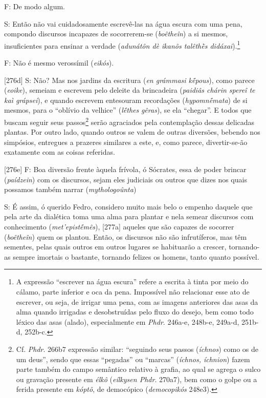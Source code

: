 F: De modo algum.

S: Então não vai cuidadosamente escrevê-las na água escura com uma pena,
compondo discursos incapazes de socorrerem-se (\emph{boêtheîn}) a si
mesmos, insuficientes para ensinar a verdade (\emph{adunátôn dè ikanôs
talêthḕs didáxai}).\footnote{A expressão ``escrever na água escura''
  refere a escrita à tinta por meio do cálamo, parte inferior e oca da
  pena. Impossível não relacionar esse ato de escrever, ou seja, de
  irrigar uma pena, com as imagens anteriores das asas da alma quando
  irrigadas e desobstruídas pelo fluxo do desejo, bem como todo léxico
  das asas (alado), especialmente em \emph{Phdr}. 246a-e, 248b-e,
  249a-d, 251b-d, 252b-c.}

F: Não é mesmo verossímil (\emph{eikós}).

{[}276d{]} S: Não? Mas nos jardins da escritura (\emph{en grámmasi
kḗpous}), como parece (\emph{eoike}), semeiam e escrevem pelo deleite da
brincadeira (\emph{paidiâs chárin spereî te kaì grápsei}), e quando
escrevem entesouram recordações (\emph{hypomnḗmata}) de si mesmos, para
o ``oblívio da velhice'' (\emph{lḗthes} \emph{gêras}), se ela
``chegar''. E todos que buscam seguir seus passos\footnote{Cf.
  \emph{Phdr}. 266b7 expressão similar: ``seguindo seus passos
  (\emph{íchnos}) como os de um deus'', sendo que essas ``pegadas'' ou
  ``marcas'' (\emph{íchnos, íchnion}) fazem parte também do campo
  semântico relativo à grafia, ao qual se agrega o sulco ou gravação
  presente em \emph{élkô} (\emph{eílkysen Phdr}. 270a7), bem como o
  golpe ou a ferida presente em \emph{kóptô}, de democópico
  (\emph{democopikós} 248e3).} serão agraciados pela contemplação dessas
delicadas plantas. Por outro lado, quando outros se valem de outras
diversões, bebendo nos simpósios, entregues a prazeres similares a este,
e, como parece, divertir-se-ão exatamente com as coisas referidas.

{[}276e{]} F: Boa diversão frente àquela frívola, ó Sócrates, essa de
poder brincar (\emph{paídzein}) com os discursos, sejam eles judiciais
ou outros que dizes nos quais possamos também narrar
(\emph{mythologoûnta})

S: É assim, ó querido Fedro, considero muito mais belo o empenho daquele
que pela arte da dialética toma uma alma para plantar e nela semear
discursos com conhecimento (\emph{met'epistḗmês}), {[}277a{]} aqueles
que são capazes de socorrer (\emph{boêtheîn}) quem os plantou. Então, os
discursos não são infrutíferos, mas têm sementes, pelas quais outros em
outros lugares se habituarão a crescer, tornando-as sempre imortais o
bastante, tornando felizes os homens, tanto quanto possível.

